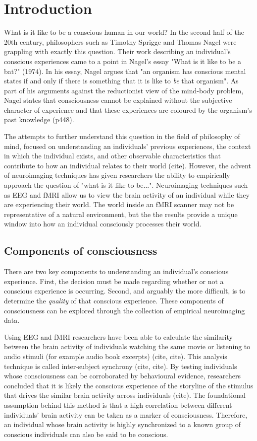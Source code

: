 \chapter{Introduction}
What is it like to be a conscious human in our world? 
In the second half of the 20th century, philosophers such as Timothy Sprigge and Thomas Nagel were grappling with exactly this question.
Their work describing an individual's conscious experiences came to a point in Nagel's essay "What is it like to be a bat?" (1974). In his essay, Nagel argues that "an organism has conscious mental states if and only if there is something that it is like to \textit{be} that organism". 
As part of his arguments against the reductionist view of the mind-body problem, Nagel states that consciousness cannot be explained without the subjective character of experience and that these experiences are coloured by the organism's past knowledge (p448).

The attempts to further understand this question in the field of philosophy of mind, focused on understanding an individuals' previous experiences, the context in which the individual exists, and other observable characteristics that contribute to how an individual relates to their world (cite). 
However, the advent of neuroimaging techniques has given researchers the ability to empirically approach the question of "what is it like to be...". 
Neuroimaging techniques such as EEG and fMRI allow us to view the brain activity of an individual while they are experiencing their world. 
The world inside an fMRI scanner may not be representative of a natural environment, but the the results provide a unique window into how an individual consciously processes their world. 
\section{Components of consciousness}
There are two key components to understanding an individual's conscious experience. 
First, the decision must be made regarding whether or not a conscious experience is occurring. 
Second, and arguably the more difficult, is to determine the \textit{quality} of that conscious experience.
These components of consciousness can be explored through the collection of empirical neuroimaging data. 

Using EEG and fMRI researchers have been able to calculate the similarity between the brain activity of individuals watching the same movie or listening to audio stimuli (for example audio book excerpts) (cite, cite). 
This analysis technique is called inter-subject synchrony (cite, cite). 
By testing individuals whose consciousness can be corroborated by behavioural evidence, researchers concluded that it is likely the conscious experience of the storyline of the stimulus that drives the similar brain activity across individuals (cite). 
The foundational assumption behind this method is that a high correlation between different individuals' brain activity can be taken as a marker of consciousness.
Therefore, an individual whose brain activity is highly synchronized to a known group of conscious individuals can also be said to be conscious.

